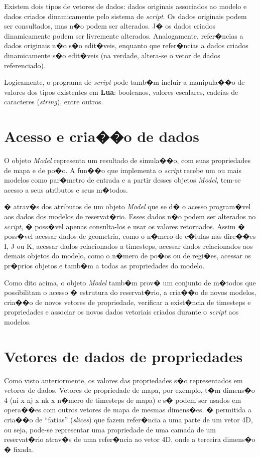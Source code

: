 \documentclass[dissertacao,modelo1,brazil]{ThesisPUC}
\newcommand{\script}{\emph{script}}
\begin{document}
Existem dois tipos de vetores de dados: dados originais associados ao modelo e 
dados criados dinamicamente pelo sistema de \script{}. Os dados originais podem 
ser consultados, mas n�o podem ser alterados. J� os dados criados 
dinamicamente podem ser livremente alterados. Analogamente, refer�ncias a 
dados originais n�o s�o edit�veis, enquanto que refer�ncias a dados criados 
dinamicamente s�o edit�veis (na verdade, altera-se o vetor de dados 
referenciado). 

Logicamente, o programa de \script{} pode tamb�m incluir a manipula��o de 
valores dos tipos existentes em \textbf{Lua}: booleanos, valores escalares, cadeias de 
caracteres (\emph{string}), entre outros. 

\section{Acesso e cria��o de dados}

O objeto \emph{Model} representa um resultado de simula��o, com suas propriedades 
de mapa e de po�o. A fun��o que implementa o \script{} recebe um ou mais 
modelos como par�metro de entrada e a partir desses objetos \emph{Model}, tem-se acesso 
a seus atributos e seus m�todos.

� atrav�s dos atributos de um objeto \emph{Model} que se d� o acesso program�vel aos dados
dos modelos de reservat�rio. Esses dados n�o podem ser alterados no \script, � poss�vel apenas
consulta-los e usar os valores retornados. Assim � poss�vel acessar dados de geometria,
como o n�mero de c�lulas nas dire��es I, J ou K, acessar dados relacionados a timesteps,
acessar dados relacionados aos demais objetos do modelo, como o n�mero de po�os ou
de regi�es, acessar os pr�prios objetos e tamb�m a todas as propriedades do modelo.

Como dito acima, o objeto \emph{Model} tamb�m prov� um conjunto de m�todos
que possibilitam o acesso � estrutura do reservat�rio, a cria��o de novos 
modelos, cria��o de novos vetores de propriedade, verificar a exist�ncia
de timesteps e propriedades e associar os novos dados vetoriais criados
durante o \script{} aos modelos.

\section{Vetores de dados de propriedades}

Como visto anteriormente, os valores das propriedades s�o representados em vetores de dados. 
Vetores de propriedade de mapa, por exemplo, t�m dimens�o 4 (ni x nj x nk x n�mero de timesteps de 
mapa) e s� podem ser usados em opera��es com outros vetores de mapa de 
mesmas dimens�es. � permitida a cria��o de ``fatias'' (\emph{slices}) que fazem 
refer�ncia a uma parte de um vetor 4D, ou seja, pode-se representar uma 
propriedade de uma camada de um reservat�rio atrav�s de uma refer�ncia ao 
vetor 4D, onde a terceira dimens�o � fixada.
\end{document}

